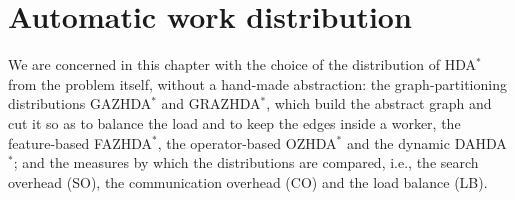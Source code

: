 \chapter{Automatic work distribution}\label{ch:auto-distributions}

\begin{center}
\end{center}

We are concerned in this chapter with the choice of the distribution of HDA$^*$
from the problem itself, without a hand-made abstraction: the
graph-partitioning distributions GAZHDA$^*$ and GRAZHDA$^*$, which build the
abstract graph and cut it so as to balance the load and to keep the edges
inside a worker, the feature-based FAZHDA$^*$, the operator-based OZHDA$^*$ and
the dynamic DAHDA$^*$; and the measures by which the distributions are
compared, i.e., the search overhead (SO), the communication overhead
(CO) and the load balance (LB).

